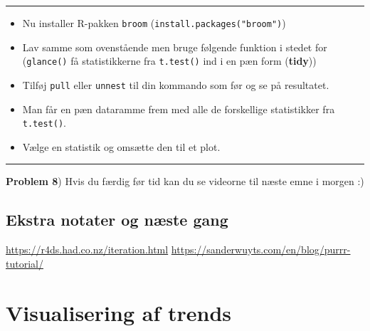 \documentclass[
]{book}
\newenvironment{Shaded}{\begin{snugshade}}{\end{snugshade}}
\newcommand{\ErrorTok}[1]{\textcolor[rgb]{0.64,0.00,0.00}{\textbf{#1}}}
\newcommand{\FunctionTok}[1]{\textcolor[rgb]{0.00,0.00,0.00}{#1}}
\newcommand{\NormalTok}[1]{#1}
\newcommand{\OtherTok}[1]{\textcolor[rgb]{0.56,0.35,0.01}{#1}}
\newcommand{\SpecialCharTok}[1]{\textcolor[rgb]{0.00,0.00,0.00}{#1}}
\providecommand{\tightlist}{%
  \setlength{\itemsep}{0pt}\setlength{\parskip}{0pt}}
\begin{document}
\begin{center}\rule{0.5\linewidth}{0.5pt}\end{center}

\begin{itemize}
\tightlist
\item
  Nu installer R-pakken \texttt{broom} (\texttt{install.packages("broom")})
\item
  Lav samme som ovenstående men bruge følgende funktion i stedet for (\texttt{glance()} få statistikkerne fra \texttt{t.test()} ind i en pæn form (\textbf{tidy}))
\end{itemize}

\begin{Shaded}
\end{Shaded}

\begin{itemize}
\item
  Tilføj \texttt{pull} eller \texttt{unnest} til din kommando som før og se på resultatet.
\item
  Man får en pæn dataramme frem med alle de forskellige statistikker fra \texttt{t.test()}.
\item
  Vælge en statistik og omsætte den til et plot.
\end{itemize}

\begin{center}\rule{0.5\linewidth}{0.5pt}\end{center}

\textbf{Problem 8}) Hvis du færdig før tid kan du se videorne til næste emne i morgen :)

\hypertarget{ekstra-notater-og-nuxe6ste-gang}{%
\section{Ekstra notater og næste gang}\label{ekstra-notater-og-nuxe6ste-gang}}

\url{https://r4ds.had.co.nz/iteration.html}
\url{https://sanderwuyts.com/en/blog/purrr-tutorial/}

\hypertarget{visualisering-af-trends}{%
\chapter{Visualisering af trends}\label{visualisering-af-trends}}
\end{document}
